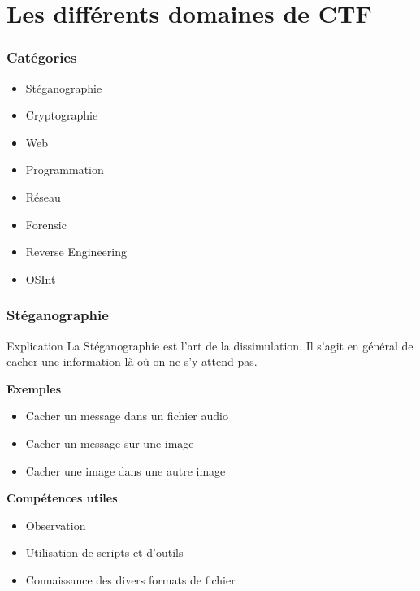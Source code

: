 \documentclass{beamer}
\begin{document}
\section{Les différents domaines de CTF}

\begin{frame}\frametitle{Catégories}

\begin{itemize}
    \item Stéganographie
    \item Cryptographie
    \item Web
    \item Programmation
    \item Réseau
    \item Forensic
    \item Reverse Engineering
    \item OSInt
\end{itemize}

\end{frame}


\begin{frame}
\frametitle{Stéganographie}

\begin{block}{Explication}
    La Stéganographie est l’art de la dissimulation. Il s’agit en général de cacher une information là où on ne s’y attend pas.
\end{block}

\pause

\textbf{Exemples}
\begin{itemize}
    \item Cacher un message dans un fichier audio
    \item Cacher un message sur une image
    \item Cacher une image dans une autre image
\end{itemize}

\pause

\textbf{Compétences utiles}
\begin{itemize}
    \item Observation \\
    \item Utilisation de scripts et d'outils\\
    \item Connaissance des divers formats de fichier
\end{itemize}

\end{frame}
\end{document}
